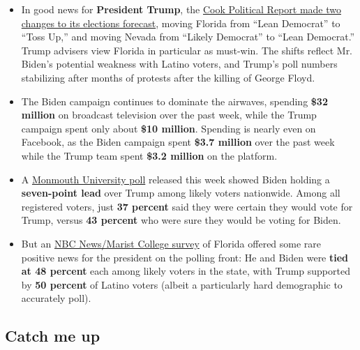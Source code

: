\begin{itemize}
\tightlist
\item
  In good news for \textbf{President Trump}, the
  \href{https://cookpolitical.com/analysis/national/national-politics/electoral-college-rating-changes-florida-and-nevada-shift-right}{Cook
  Political Report made two changes to its elections forecast}, moving
  Florida from ``Lean Democrat'' to ``Toss Up,'' and moving Nevada from
  ``Likely Democrat'' to ``Lean Democrat.'' Trump advisers view Florida
  in particular as must-win. The shifts reflect Mr. Biden's potential
  weakness with Latino voters, and Trump's poll numbers stabilizing
  after months of protests after the killing of George Floyd.
\end{itemize}

\begin{itemize}
\item
  The Biden campaign continues to dominate the airwaves, spending
  \textbf{\$32 million} on broadcast television over the past week,
  while the Trump campaign spent only about \textbf{\$10 million}.
  Spending is nearly even on Facebook, as the Biden campaign spent
  \textbf{\$3.7 million} over the past week while the Trump team spent
  \textbf{\$3.2 million} on the platform.
\item
  A
  \href{https://www.monmouth.edu/polling-institute/reports/monmouthpoll_US_091020/}{Monmouth
  University poll} released this week showed Biden holding a
  \textbf{seven-point lead} over Trump among likely voters nationwide.
  Among all registered voters, just \textbf{37 percent} said they were
  certain they would vote for Trump, versus \textbf{43 percent} who were
  sure they would be voting for Biden.
\item
  But an
  \href{http://maristpoll.marist.edu/wp-content/uploads/2020/09/NBC-News_Marist-Poll_FL-Likely-Voters_NOS-and-Tables_2020090712221.pdf\#page=3}{NBC
  News/Marist College survey} of Florida offered some rare positive news
  for the president on the polling front: He and Biden were \textbf{tied
  at 48 percent} each among likely voters in the state, with Trump
  supported by \textbf{50 percent} of Latino voters (albeit a
  particularly hard demographic to accurately poll).
\end{itemize}

\hypertarget{catch-me-up}{%
\subsection{Catch me up}\label{catch-me-up}}

